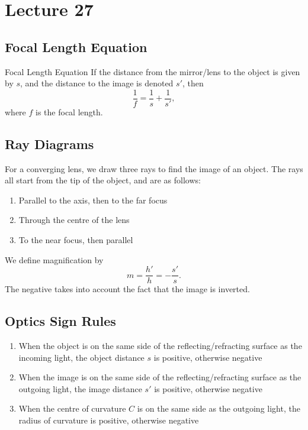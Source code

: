 \documentclass[class=article, crop=false]{standalone}
\begin{document}
  \section{Lecture 27}
  \subsection{Focal Length Equation}
  \begin{theorem}{Focal Length Equation}
    If the distance from the mirror/lens to the object is given by $s$, and the distance to the image is denoted $s'$, then
    \[
      \frac{1}{f} = \frac{1}{s} + \frac{1}{s'},
    \]
    where $f$ is the focal length.
  \end{theorem}
  \subsection{Ray Diagrams}
  For a converging lens, we draw three rays to find the image of an object. The rays all start from the tip of the object, and are as follows:
  \begin{enumerate}
    \item Parallel to the axis, then to the far focus
    \item Through the centre of the lens
    \item To the near focus, then parallel
  \end{enumerate}
  We define magnification by 
  \[
    m = \frac{h'}{h} = -\frac{s'}{s}.
  \]
  The negative takes into account the fact that the image is inverted.
  \subsection{Optics Sign Rules}
  \begin{enumerate}
    \item When the object is on the same side of the reflecting/refracting surface as the incoming light, the object distance $s$ is positive, otherwise negative
    \item When the image is on the same side of the reflecting/refracting surface as the outgoing light, the image distance $s'$ is positive, otherwise negative
    \item When the centre of curvature $C$ is on the same side as the outgoing light, the radius of curvature is positive, otherwise negative
  \end{enumerate}
\end{document}
